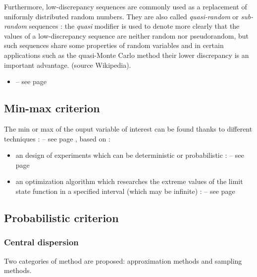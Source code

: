 Furthermore,  low-discrepancy sequences are commonly used as a replacement of uniformly distributed random numbers. They are also called  \emph{quasi-random} or  \emph{sub-random} sequences : the \emph{quasi} modifier is used to denote more clearly that the values of a low-discrepancy sequence are neither random nor pseudorandom, but such sequences share some properties of random variables and in certain applications such as the quasi-Monte Carlo method their lower discrepancy is an important advantage. (source Wikipedia).

\begin{itemize}
\item {} -- see page \pageref{docref_C_LowDiscrepancySequence} \vspace{2mm}
\end{itemize}


\subsection{Min-max criterion}

The min or max of the ouput variable of interest can be found thanks to different techniques :  -- see page \pageref{docref_C11_MinMax}, based on :

\begin{itemize}
\item an  design of experiments  which can be deterministic or probabilistic :  -- see page \pageref{docref_C11_ExperimentPlanes}
\item an optimization algorithm which researches the extreme values of the limit state function in a specified interval (which may be infinite) :  -- see page \pageref{docref_C11_OptimizationAlgo}

\end{itemize}

\subsection{Probabilistic criterion}

\subsubsection{Central dispersion}

Two categories of method are proposed: approximation methods and sampling methods.

